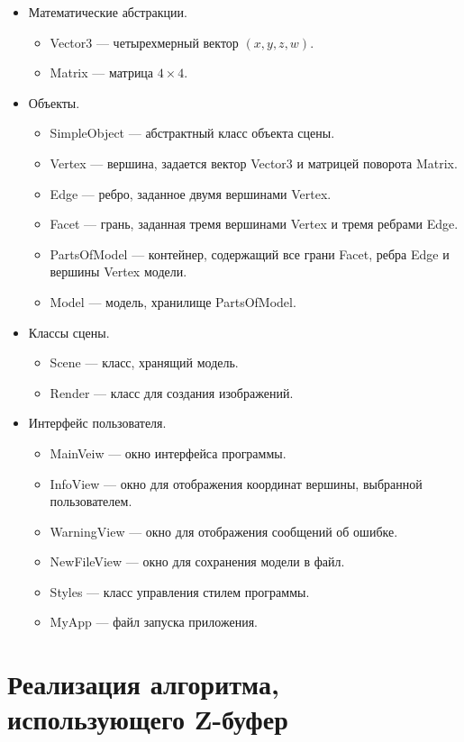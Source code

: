 \begin{itemize}
	\item Математические абстракции.
	\begin{itemize}
		\item Vector3 --- четырехмерный вектор $(x, y, z, w)$.
		\item Matrix --- матрица $4 \times 4$.
	\end{itemize}
	\item Объекты.
	\begin{itemize}
		\item SimpleObject --- абстрактный класс объекта сцены.
		\item Vertex --- вершина, задается вектор Vector3 и матрицей поворота Matrix.
		\item Edge --- ребро, заданное двумя вершинами Vertex.
		\item Facet --- грань, заданная тремя вершинами Vertex и тремя ребрами Edge.
		\item PartsOfModel --- контейнер, содержащий все грани Facet, ребра Edge и вершины Vertex модели.
		\item Model --- модель, хранилище PartsOfModel.
	\end{itemize}
	\item Классы сцены.
	\begin{itemize}
		\item Scene --- класс, хранящий модель.
		\item Render --- класс для создания изображений.
	\end{itemize}
	\item Интерфейс пользователя.
	\begin{itemize}
		\item MainVeiw --- окно интерфейса программы.
		\item InfoView --- окно для отображения координат вершины, выбранной пользователем.
		\item WarningView --- окно для отображения сообщений об ошибке.
		\item NewFileView --- окно для сохранения модели в файл.
		\item Styles --- класс управления стилем программы.
		\item MyApp --- файл запуска приложения.
	\end{itemize}
\end{itemize}

\section{Реализация алгоритма, использующего Z-буфер}


